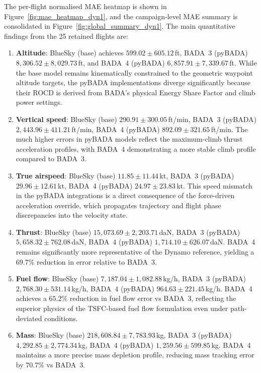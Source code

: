 The per-flight normalised MAE heatmap is shown in Figure~\ref{fig:mae_heatmap_dyn1}, and the campaign-level MAE summary is consolidated in Figure~\ref{fig:global_summary_dyn1}. The main quantitative findings from the 25 retained flights are:
\begin{enumerate}
    \item \textbf{Altitude}: BlueSky (base) achieves $599.02 \pm 605.12$\,ft, BADA~3 (pyBADA) $8{,}306.52 \pm 8{,}029.73$\,ft, and BADA~4 (pyBADA) $6{,}857.91 \pm 7{,}339.67$\,ft. While the base model remains kinematically constrained to the geometric waypoint altitude targets, the pyBADA implementations diverge significantly because their ROCD is derived from BADA's physical Energy Share Factor and climb power settings.
    \item \textbf{Vertical speed}: BlueSky (base) $290.91 \pm 300.05$\,ft/min, BADA~3 (pyBADA) $2{,}443.96 \pm 411.21$\,ft/min, BADA~4 (pyBADA) $892.09 \pm 321.65$\,ft/min. The much higher errors in pyBADA models reflect the maximum-climb thrust acceleration profiles, with BADA~4 demonstrating a more stable climb profile compared to BADA~3.
    \item \textbf{True airspeed}: BlueSky (base) $11.85 \pm 11.44$\,kt, BADA~3 (pyBADA) $29.96 \pm 12.61$\,kt, BADA~4 (pyBADA) $24.97 \pm 23.83$\,kt. This speed mismatch in the pyBADA integrations is a direct consequence of the force-driven acceleration override, which propagates trajectory and flight phase discrepancies into the velocity state.
    \item \textbf{Thrust}: BlueSky (base) $15{,}073.69 \pm 2{,}203.71$\,daN, BADA~3 (pyBADA) $5{,}658.32 \pm 762.08$\,daN, BADA~4 (pyBADA) $1{,}714.10 \pm 626.07$\,daN. BADA~4 remains significantly more representative of the Dynamo reference, yielding a $69.7\%$ reduction in error relative to BADA~3.
    \item \textbf{Fuel flow}: BlueSky (base) $7{,}187.04 \pm 1{,}082.88$\,kg/h, BADA~3 (pyBADA) $2{,}768.30 \pm 531.14$\,kg/h, BADA~4 (pyBADA) $964.63 \pm 221.45$\,kg/h. BADA~4 achieves a $65.2\%$ reduction in fuel flow error vs BADA~3, reflecting the superior physics of the TSFC-based fuel flow formulation even under path-deviated conditions.
    \item \textbf{Mass}: BlueSky (base) $218{,}608.84 \pm 7{,}783.93$\,kg, BADA~3 (pyBADA) $4{,}292.85 \pm 2{,}774.34$\,kg, BADA~4 (pyBADA) $1{,}259.56 \pm 599.85$\,kg. BADA~4 maintains a more precise mass depletion profile, reducing mass tracking error by $70.7\%$ vs BADA~3.
\end{enumerate}

